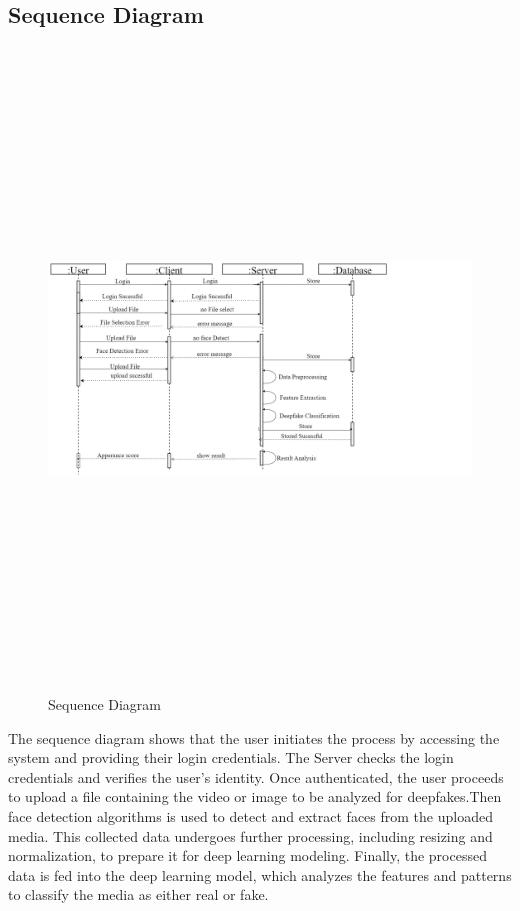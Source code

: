 
\subsection{Sequence Diagram}
\begin{figure}[h]
    \centering
    \includegraphics[height=6.7in,width= 7in ]{img/sequencediagram.drawio.png}
    \caption{Sequence Diagram}
\end{figure}
\justify
The sequence diagram shows that the user initiates the process by accessing the system and providing their login credentials. The Server checks the login credentials and verifies the user's identity. Once authenticated, the user proceeds to upload a file containing the video or image to be analyzed for deepfakes.Then face detection algorithms is used to detect and extract faces from the uploaded media. This collected data undergoes further processing, including resizing and normalization, to prepare it for deep learning modeling. Finally, the processed data is fed into the deep learning model, which analyzes the features and patterns to classify the media as either real or fake.
